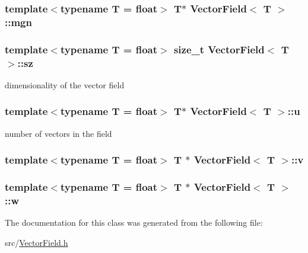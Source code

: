 \subsubsection[{mgn}]{\setlength{\rightskip}{0pt plus 5cm}template$<$typename T = float$>$ T$\ast$ {\bf Vector\+Field}$<$ T $>$\+::mgn}\label{class_vector_field_a107913a4cbfc1601d0be3fad265541ed}
\hypertarget{class_vector_field_a23c7ed72d08a14b70ea6193132ad93b8}{}
\subsubsection[{sz}]{\setlength{\rightskip}{0pt plus 5cm}template$<$typename T = float$>$ size\+\_\+t {\bf Vector\+Field}$<$ T $>$\+::sz}\label{class_vector_field_a23c7ed72d08a14b70ea6193132ad93b8}


dimensionality of the vector field 

\hypertarget{class_vector_field_a845073ac9ee0dedbd94ac7b2c79d982d}{}
\subsubsection[{u}]{\setlength{\rightskip}{0pt plus 5cm}template$<$typename T = float$>$ T$\ast$ {\bf Vector\+Field}$<$ T $>$\+::u}\label{class_vector_field_a845073ac9ee0dedbd94ac7b2c79d982d}


number of vectors in the field 

\hypertarget{class_vector_field_a14e25f68256af61b46828481053c9a74}{}
\subsubsection[{v}]{\setlength{\rightskip}{0pt plus 5cm}template$<$typename T = float$>$ T $\ast$ {\bf Vector\+Field}$<$ T $>$\+::v}\label{class_vector_field_a14e25f68256af61b46828481053c9a74}
\hypertarget{class_vector_field_ab0457f5cb47936f2472d76b34c2812e5}{}
\subsubsection[{w}]{\setlength{\rightskip}{0pt plus 5cm}template$<$typename T = float$>$ T $\ast$ {\bf Vector\+Field}$<$ T $>$\+::w}\label{class_vector_field_ab0457f5cb47936f2472d76b34c2812e5}


The documentation for this class was generated from the following file\+:\begin{DoxyCompactItemize}
\item 
src/\hyperlink{_vector_field_8h}{Vector\+Field.\+h}\end{DoxyCompactItemize}
